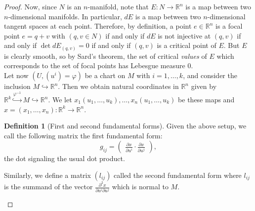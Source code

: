 \documentclass[reqno]{amsart}
\theoremstyle{definition}
\newtheorem{definition}[theorem]{Definition}
\theoremstyle{remark}
\begin{document}
\begin{proof}
        Now, since $N$ is an $n$-manifold, note that
        $E \colon N \to \mathbb{R}^{n}$ is a map
        between two $n$-dimensional manifolds. In particular,
        $dE$ is a map between two $n$-dimensional tangent spaces
        at each point. Therefore,
        by definition, a point
        $e \in \mathbb{R}^{n}$ is a focal point
        $e = q+v$ with
        $\left( q,v \in N \right) $ 
        if and only if $dE$ is not injective at
        $(q,v)$ if and only if
        $\det dE_{(q,v)} = 0$ if and only if
        $(q,v)$ is a critical point of $E$.
        But $E$ is clearly smooth, so by
        Sard's theorem, the set of critical \textit{values}
        of $E$ which corresponds to the set of focal points
        has Lebesgue measure $0$.\\
        \linebreak
        Let now $\left( U, \left( u^{i} \right) = \varphi  \right) $ 
        be a chart on $M$ with $i = 1,\ldots,k$, and
        consider the inclusion
        $M \hookrightarrow \mathbb{R}^{n}$.
        Then we obtain natural coordinates
        in $\mathbb{R}^{n}$ given by
        $\mathbb{R}^{k} \stackrel{\varphi^{-1}}{\hookrightarrow} M \hookrightarrow 
        \mathbb{R}^{n}$.
        We let
        $x_1\left( u_1,\ldots,u_k \right) ,\ldots,
        x_n \left( u_1,\ldots,u_k \right) $ be these
        maps and
        $x = \left( x_1,\ldots, x_n \right) \colon
        \mathbb{R}^{k} \to \mathbb{R}^{n}$.
        
        \begin{definition}[First and second fundamental forms]
            Given the above setup, we call
            the following matrix the first fundamental form:
            \[
            g_{ij} = 
            \begin{pmatrix} \frac{\partial x}{\partial u^i}
            \cdot \frac{\partial x}{\partial u^{j}} \end{pmatrix} ,
            \] 
            the dot signaling the usual dot product.

            Similarly, we define a matrix
            $\left( l_{ij} \right) $ called the
            second fundamental form where
            $l_{ij}$ is the summand of the vector
            $\frac{\partial^2 x}{\partial u^{i} \partial
            u^{j}}$ which is normal to $M$.



        \end{definition}


    \end{proof}
\end{document}
